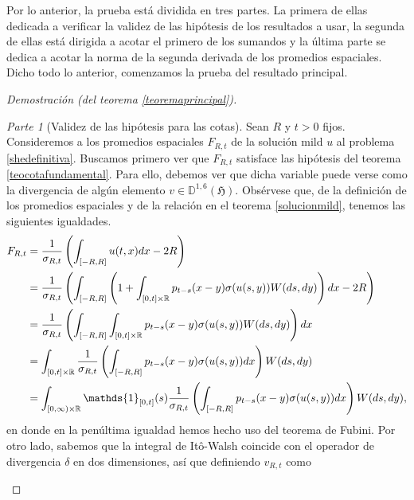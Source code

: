 \documentclass[letterpaper,twoside,12pt]{book}
\newcommand{\R}{\mathbb{R}}
\newcommand{\D}{\mathbb{D}}
\newcommand{\1}{\mathds{1}}
\theoremstyle{definition}
\theoremstyle{definition}
\theoremstyle{remark}
\newtheorem{proofpart}{Parte}
\theoremstyle{definition}
\theoremstyle{definition}
\theoremstyle{definition}
\theoremstyle{definition}
\theoremstyle{definition}
\begin{document}
Por lo anterior, la prueba está dividida en tres partes. La primera de ellas dedicada a verificar la validez de las hipótesis de los resultados a usar, la segunda de ellas está dirigida a acotar el primero de los sumandos y la última parte se dedica a acotar la norma de la segunda derivada de los promedios espaciales. Dicho todo lo anterior, comenzamos la prueba del resultado principal.
\begin{proof}[Demostración (del teorema \ref{teoremaprincipal})]

\begin{proofpart}[Validez de las hipótesis para las cotas]
Sean $R$ y $t>0$ fijos. Consideremos a los promedios espaciales $F_{R,t}$ de la solución mild $u$ al problema \eqref{shedefinitiva}. Buscamos primero ver que $F_{R,t}$ satisface las hipótesis del teorema \ref{teocotafundamental}. Para ello, debemos ver que dicha variable puede verse como la divergencia de algún elemento $v\in \D^{1,6}(\mathfrak{H})$. Obsérvese que, de la definición de los promedios espaciales y de la relación en el teorema \ref{solucionmild}, tenemos las siguientes igualdades.
\begin{align}
   F_{R,t}&=\frac{1}{\sigma_{R,t}}\left(\int_{[-R,R]}u(t,x)dx-2R\right)\notag\\
   &=\frac{1}{\sigma_{R,t}}\left(\int_{[-R,R]}\left(1+\int_{[0,t]\times \R}p_{t-s}(x-y)\sigma(u(s,y))W(ds,dy)\right)dx-2R\right)\notag\\
   &=\frac{1}{\sigma_{R,t}}\left(\int_{[-R,R]}\int_{[0,t]\times \R}p_{t-s}(x-y)\sigma(u(s,y))W(ds,dy)\right)dx\notag\\
   &=\int_{[0,t]\times \R}\frac{1}{\sigma_{R,t}}\left(\int_{[-R,R]}p_{t-s}(x-y)\sigma(u(s,y))dx\right)W(ds,dy)\notag\\
   &=\int_{[0,\infty)\times \R}\1_{[0,t]}(s)\frac{1}{\sigma_{R,t}}\left(\int_{[-R,R]}p_{t-s}(x-y)\sigma(u(s,y))dx\right)W(ds,dy)\label{promespacdiv1},
\end{align}
en donde en la penúltima igualdad hemos hecho uso del teorema de Fubini. Por otro lado, sabemos que la integral de Itô-Walsh coincide con el operador de divergencia $\delta$ en dos dimensiones, así que definiendo $v_{R,t}$ como 


\end{proofpart}
\end{proof}
\end{document}
